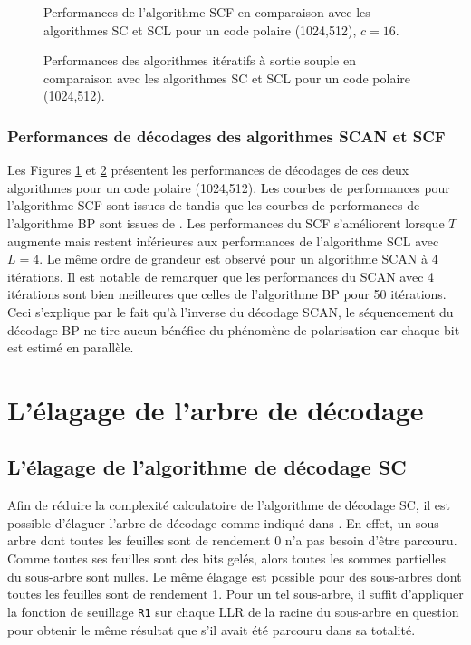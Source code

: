 \begin{figure}[h]
  \centering
  
  \caption{Performances de l'algorithme SCF en comparaison avec les algorithmes SC et SCL pour un code polaire (1024,512), $c=16$.}
  \label{fig:scf}
\end{figure}
\begin{figure}[h]
  \centering
  
  \caption{Performances des algorithmes itératifs à sortie souple en comparaison avec les algorithmes SC et SCL pour un code polaire (1024,512).}
  \label{fig:bp_scan}
\end{figure}
\subsubsection{Performances de décodages des algorithmes SCAN et SCF}
Les Figures \ref{fig:scf} et \ref{fig:bp_scan} présentent les performances de décodages de ces deux algorithmes pour un code polaire (1024,512). Les courbes de performances pour l'algorithme SCF sont issues de \cite{afisiadis_low-complexity_2014} tandis que les courbes de performances de l'algorithme BP sont issues de \cite{pamuk_fpga_2011}. Les performances du SCF s'améliorent lorsque $T$ augmente mais restent inférieures aux performances de l'algorithme SCL avec $L=4$. Le même ordre de grandeur est observé pour un algorithme SCAN à 4 itérations. Il est notable de remarquer que les performances du SCAN avec 4 itérations sont bien meilleures que celles de l'algorithme BP pour 50 itérations. Ceci s'explique par le fait qu'à l'inverse du décodage SCAN, le séquencement du décodage BP ne tire aucun bénéfice du phénomène de polarisation car chaque bit est estimé en parallèle.

\section{L'élagage de l'arbre de décodage}


\subsection{L'élagage de l'algorithme de décodage SC}
Afin de réduire la complexité calculatoire de l'algorithme de décodage SC, il est possible d'élaguer l'arbre de décodage comme indiqué dans \cite{alamdar-yazdi_simplified_2011}. En effet, un sous-arbre dont toutes les feuilles sont de rendement 0 n'a pas besoin d'être parcouru. Comme toutes ses feuilles sont des bits gelés, alors toutes les sommes partielles du sous-arbre sont nulles. Le même élagage est possible pour des sous-arbres dont toutes les feuilles sont de rendement 1. Pour un tel sous-arbre, il suffit d'appliquer la fonction de seuillage \texttt{R1} sur chaque LLR de la racine du sous-arbre en question pour obtenir le même résultat que s'il avait été parcouru dans sa totalité.

